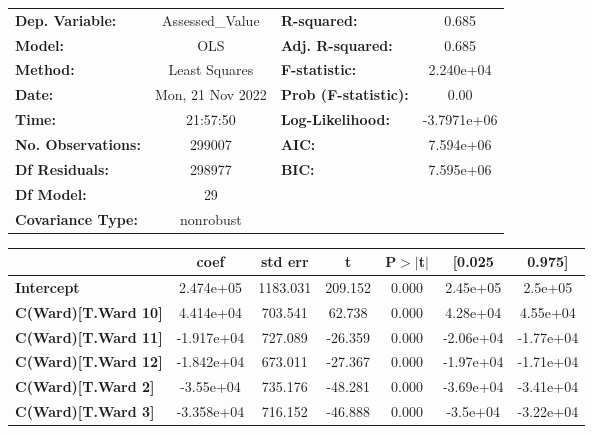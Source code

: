 \documentclass{report}
\begin{document}
\begin{center}
\begin{tabular}{lclc}
\toprule
\textbf{Dep. Variable:}     & Assessed\_Value  & \textbf{  R-squared:         } &      0.685   \\
\textbf{Model:}             &       OLS        & \textbf{  Adj. R-squared:    } &      0.685   \\
\textbf{Method:}            &  Least Squares   & \textbf{  F-statistic:       } &  2.240e+04   \\
\textbf{Date:}              & Mon, 21 Nov 2022 & \textbf{  Prob (F-statistic):} &      0.00    \\
\textbf{Time:}              &     21:57:50     & \textbf{  Log-Likelihood:    } & -3.7971e+06  \\
\textbf{No. Observations:}  &      299007      & \textbf{  AIC:               } &  7.594e+06   \\
\textbf{Df Residuals:}      &      298977      & \textbf{  BIC:               } &  7.595e+06   \\
\textbf{Df Model:}          &          29      & \textbf{                     } &              \\
\textbf{Covariance Type:}   &    nonrobust     & \textbf{                     } &              \\
\bottomrule
\end{tabular}
\begin{tabular}{lcccccc}
                            & \textbf{coef} & \textbf{std err} & \textbf{t} & \textbf{P$> |$t$|$} & \textbf{[0.025} & \textbf{0.975]}  \\
\midrule
\textbf{Intercept}          &    2.474e+05  &     1183.031     &   209.152  &         0.000        &     2.45e+05    &      2.5e+05     \\
\textbf{C(Ward)[T.Ward 10]} &    4.414e+04  &      703.541     &    62.738  &         0.000        &     4.28e+04    &     4.55e+04     \\
\textbf{C(Ward)[T.Ward 11]} &   -1.917e+04  &      727.089     &   -26.359  &         0.000        &    -2.06e+04    &    -1.77e+04     \\
\textbf{C(Ward)[T.Ward 12]} &   -1.842e+04  &      673.011     &   -27.367  &         0.000        &    -1.97e+04    &    -1.71e+04     \\
\textbf{C(Ward)[T.Ward 2]}  &    -3.55e+04  &      735.176     &   -48.281  &         0.000        &    -3.69e+04    &    -3.41e+04     \\
\textbf{C(Ward)[T.Ward 3]}  &   -3.358e+04  &      716.152     &   -46.888  &         0.000        &     -3.5e+04    &    -3.22e+04     \\

\end{tabular}
\end{center}
\end{document}
